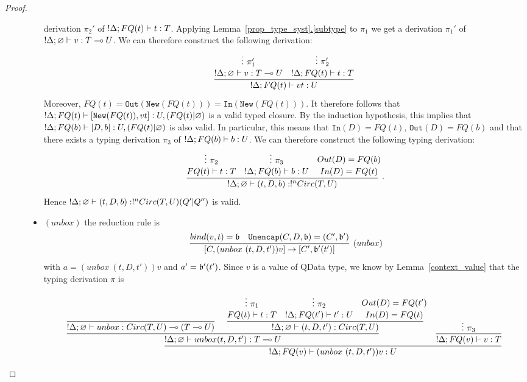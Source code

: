 \documentclass{article}
\begin{document}
\begin{proof}
\begin{description}
\begin{itemize}
  derivation $\pi_2'$ of $!\Delta;FQ(t)\vdash t:T$. 
  Applying Lemma~\hyperref[subtype]{\ref*{prop_type_syst}.\ref*{subtype}}
  to $\pi_1$ we get a derivation $\pi_1'$ of $!\Delta ;\varnothing\vdash v:T\multimap U$.
  We can therefore construct the following derivation:
  \[
  \infer[]{!\Delta;FQ(t)\entails vt : U}{
    \deduce[]{!\Delta ;\varnothing\entails v:T\loli U}{
      \vdots ~\pi_1'
    }
    &
    \deduce[]{!\Delta;FQ(t)\entails t:T}{
      \vdots ~\pi_2'
    }
  }
  \]
  Moreover, $FQ(t)=\mathtt{Out}(\mathtt{New}(FQ(t)))=\mathtt{In}(\mathtt{New}(FQ(t)))$. 
  It therefore follows that $!\Delta;FQ(t)\vdash [\mathtt{New}(FQ(t)),vt]:U,(FQ(t)|\varnothing)$ 
  is a valid typed closure. By the induction hypothesis, this implies that 
  $!\Delta;FQ(b)\vdash [D,b]:U,(FQ(t)|\varnothing)$ is also valid.
  In particular, this means that $\mathtt{In}(D)=FQ(t)$, $\mathtt{Out}(D)=FQ(b)$ 
  and that there exists a typing derivation $\pi_3$ of $!\Delta;FQ(b)\vdash b:U$.
  We can therefore construct the following typing derivation:
  \[
  \infer[.]{!\Delta;\varnothing \entails (t,D,b):!^nCirc(T,U)}{
    \deduce[]{FQ(t)\entails t:T}{
      \vdots~\pi_2
    }
    &
    \deduce[]{!\Delta ; FQ(b)\entails b:U}{
      \vdots~\pi_3
    } 
    &
    \deduce[]{In(D)=FQ(t) }{
      Out(D)=FQ(b)
    }
  }
  \]  
  Hence $!\Delta ;\varnothing \vdash (t,D,b):!^nCirc(T,U) (Q'|Q'')$ is valid.
  \item $(unbox)$ the reduction rule is
  \[
    \infer[(unbox)]{[C,(unbox~(t,D,t'))v]\to [C',\binding'(t')]}{
      bind(v,t)=\binding 
      &
      \mathtt{Unencap}(C,D,\binding) = (C',\binding') 
    }
  \]
  with $a=(unbox~(t,D,t'))v$ and $a'=\mathfrak{b}'(t')$. Since $v$ is a value of 
  QData type, we know by 
  Lemma~\hyperref[context_value]{\ref*{context_value}}
  that the typing derivation $\pi$ is 
  \begin{changemargin}{-4cm}{-2.3cm}
  \[
  \infer[]{!\Delta; FQ(v)\entails (unbox~(t,D,t'))v :U}{
    \infer[]{!\Delta;\varnothing\entails unbox(t,D,t'):T\loli U}{
      \infer[]{!\Delta;\varnothing \entails unbox:Circ(T,U)\loli (T\loli U)}{
      }   
      &
      \infer[]{!\Delta ;\varnothing\entails (t,D,t'):Circ(T,U)}{
        \deduce[]{FQ(t)\entails t:T}{
          \vdots ~\pi_1
        }
        &
        \deduce[]{!\Delta;FQ(t')\entails t':U}{
          \vdots ~\pi_2     
        }
        &
        \deduce[]{In(D)=FQ(t)}{
          Out(D)=FQ(t')
        }
      }
    }
    &
    \infer[]{!\Delta ; FQ(v)\entails v:T}{
      \vdots~\pi_3
    }
  }
  \]
  \end{changemargin}

\end{itemize}
\end{description}
\end{proof}
\end{document}

